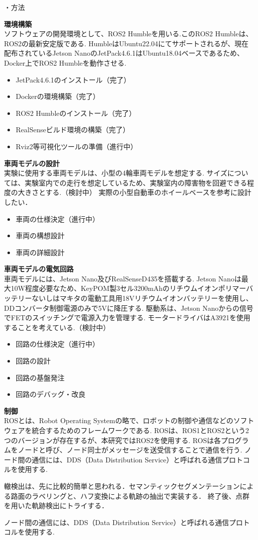 \documentclass[a4paper]{jarticle}
\begin{document}
・方法{
\textbf{環境構築\\}
ソフトウェアの開発環境として、ROS2 Humbleを用いる.このROS2 Humbleは、ROS2の最新安定版である.
HumbleはUbuntu22.04にてサポートされるが、現在配布されているJetson NanoのJetPack4.6.1はUbuntu18.04ベースであるため、Docker上でROS2 Humbleを動作させる.

\begin{itemize}
	\item JetPack4.6.1のインストール（完了）
	\item Dockerの環境構築（完了）
	\item ROS2 Humbleのインストール（完了）
	\item RealSenseビルド環境の構築（完了）
	\item Rviz2等可視化ツールの準備（進行中）
\end{itemize}

\textbf{車両モデルの設計\\}
実験に使用する車両モデルは、小型の4輪車両モデルを想定する.
サイズについては、実験室内での走行を想定しているため、実験室内の障害物を回避できる程度の大きさとする.（検討中）
実際の小型自動車のホイールベースを参考に設計したい．

\begin{itemize}
	\item 車両の仕様決定（進行中）
	\item 車両の構想設計
	\item 車両の詳細設計
\end{itemize}

\textbf{車両モデルの電気回路\\}
車両モデルには、Jetson Nano及びRealSenseD435を搭載する.
Jetson Nanoは最大10W程度必要なため、KeyPOM製3セル3200mAhのリチウムイオンポリマーバッテリーないしはマキタの電動工具用18Vリチウムイオンバッテリーを使用し、
DDコンバータ制御電源のみで5Vに降圧する.
駆動系は、Jetson Nanoからの信号でFETのスイッチングで電源入力を管理する.
モータードライバはA3921を使用することを考えている.（検討中）

\begin{itemize}
	\item 回路の仕様決定（進行中）
	\item 回路の設計
	\item 回路の基盤発注
	\item 回路のデバッグ・改良
\end{itemize}



\textbf{制御\\}
ROSとは、Robot Operating Systemの略で、ロボットの制御や通信などのソフトウェアを統合するためのフレームワークである.
ROSは、ROS1とROS2という2つのバージョンが存在するが、本研究ではROS2を使用する.
ROSは各プログラムをノードと呼び、ノード同士がメッセージを送受信することで通信を行う.
ノード間の通信には、DDS（Data Distribution Service）と呼ばれる通信プロトコルを使用する.

轍検出は、先に比較的簡単と思われる．セマンティックセグメンテーションによる路面のラベリングと、ハフ変換による軌跡の抽出で実装する．
終了後、点群を用いた軌跡検出にトライする．

ノード間の通信には、DDS（Data Distribution Service）と呼ばれる通信プロトコルを使用する.
}
\end{document}
